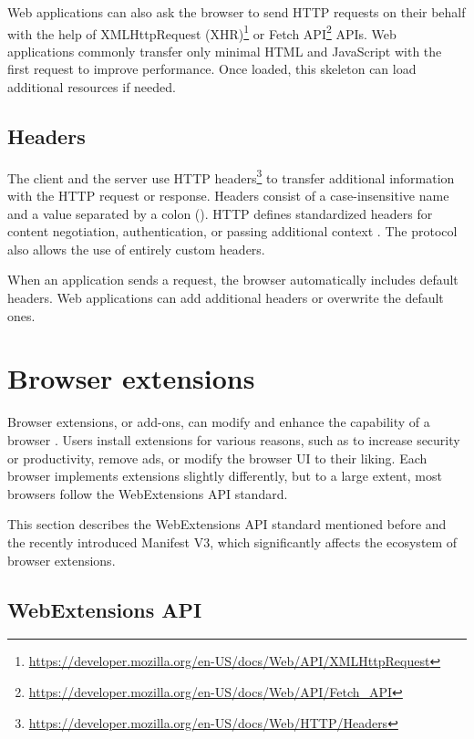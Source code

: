 Web applications can also ask the browser to send HTTP requests on their behalf with the help of XMLHttpRequest (XHR)\footnote{\url{https://developer.mozilla.org/en-US/docs/Web/API/XMLHttpRequest}} or Fetch API\footnote{\url{https://developer.mozilla.org/en-US/docs/Web/API/Fetch_API}} APIs. Web applications commonly transfer only minimal HTML and JavaScript with the first request to improve performance. Once loaded, this skeleton can load additional resources if needed.

\subsection{Headers}

The client and the server use HTTP headers\footnote{\url{https://developer.mozilla.org/en-US/docs/Web/HTTP/Headers}} to transfer additional information with the HTTP request or response. Headers consist of a case-insensitive name and a value separated by a colon (\uv{:}). HTTP defines standardized headers for content negotiation, authentication, or passing additional context \cite{RFC9110}. The protocol also allows the use of entirely custom headers.

When an application sends a request, the browser automatically includes default headers. Web applications can add additional headers or overwrite the default ones.

\section{Browser extensions}

Browser extensions, or add-ons, can modify and enhance the capability of a browser \cite{MDNWebExtensions}. Users install extensions for various reasons, such as to increase security or productivity, remove ads, or modify the browser UI to their liking. Each browser implements extensions slightly differently, but to a large extent, most browsers follow the WebExtensions API standard.

This section describes the WebExtensions API standard mentioned before and the recently introduced Manifest V3, which significantly affects the ecosystem of browser extensions.

\label{Chapter:Extensions}

\subsection{WebExtensions API}
\label{Section:WebExtensionsAPI}

